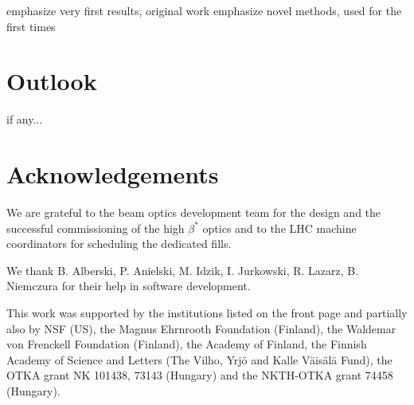 \documentclass[3p,twocolumn,a4paper]{elsarticle}
\def\hang{\hangindent=\parindent}
\def\>{\par\vskip\itskip\parindent\itindent\indent\hang\llap{\hbox to3mm{$\bullet$\hss}}}
\def\>E{\par\vskip\itskip\parindent\itindent\indent\hang\llap{\hbox to3mm{\hss}}}
\def\>>{\par\vskip\iitskip\parindent\iitindent\indent\hang\llap{\hbox to\iitindent{\hss--\ }}}
\begin{document}
\> emphasize very first results, original work
\> emphasize novel methods, used for the first times



\section{Outlook}

\> if any...





\section*{Acknowledgements}
We are grateful to the beam optics development team for the design and the 
successful commissioning of the high $\beta^{*}$ optics and to the LHC machine 
coordinators for scheduling the dedicated fills.

We thank B. Alberski, P. Anielski, M. Idzik, I. Jurkowski, R. Lazarz, 
B. Niemczura for their help in software development.

This work was supported by the institutions listed on the front page and 
partially also by NSF (US), the Magnus Ehrnrooth Foundation (Finland), the 
Waldemar von Frenckell Foundation (Finland), the Academy of Finland, the 
Finnish Academy of Science and Letters (The Vilho, Yrj\"o and Kalle 
V\"ais\"al\"a Fund), the OTKA grant NK 101438, 73143 (Hungary) and the 
NKTH-OTKA grant 74458 (Hungary).
\end{document}

